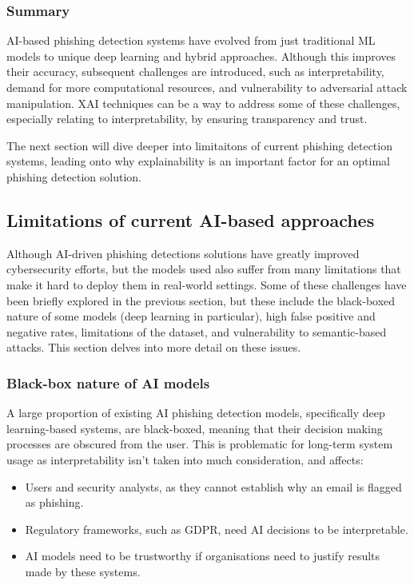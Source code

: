 \subsubsection*{Summary}
AI-based phishing detection systems have evolved from just traditional ML models to unique deep learning and hybrid approaches. Although this improves their accuracy, subsequent challenges are introduced, such as interpretability, demand for more computational resources, and vulnerability to adversarial attack manipulation. XAI techniques can be a way to address some of these challenges, especially relating to interpretability, by ensuring transparency and trust.\newline

\noindent The next section will dive deeper into limitaitons of current phishing detection systems, leading onto why explainability is an important factor for an optimal phishing detection solution.

\newpage

\subsection*{Limitations of current AI-based approaches}
Although AI-driven phishing detections solutions have greatly improved cybersecurity efforts, but the models used also suffer from many limitations that make it hard to deploy them in real-world settings. Some of these challenges have been briefly explored in the previous section, but these include the black-boxed nature of some models (deep learning in particular), high false positive and negative rates, limitations of the dataset, and vulnerability to semantic-based attacks. This section delves into more detail on these issues.

\subsubsection*{Black-box nature of AI models}
A large proportion of existing AI phishing detection models, specifically deep learning-based systems, are black-boxed, meaning that their decision making processes are obscured from the user. This is problematic for long-term system usage as interpretability isn't taken into much consideration, and affects:

\begin{itemize}
    \item Users and security analysts, as they cannot establish why an email is flagged as phishing.
    \item Regulatory frameworks, such as GDPR, need AI decisions to be interpretable.
    \item AI models need to be trustworthy if organisations need to justify results made by these systems.
\end{itemize}

